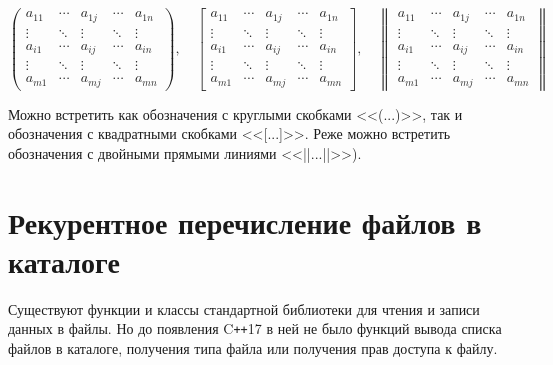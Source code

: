 \documentclass[a4paper, 12pt]{article} %
\begin{document}
\begin{equation*}
    \begin{pmatrix}
        a_{11} & \cdots & a_{1j} & \cdots & a_{1n} \\
        \vdots & \ddots & \vdots & \ddots & \vdots \\
        a_{i1} & \cdots & a_{ij} & \cdots & a_{in} \\
        \vdots & \ddots & \vdots & \ddots & \vdots \\
        a_{m1} & \cdots & a_{mj} & \cdots & a_{mn}
    \end{pmatrix},\quad\left[\begin{array}{ccccc}
            a_{11} & \cdots & a_{1j} & \cdots & a_{1n} \\
            \vdots & \ddots & \vdots & \ddots & \vdots \\
            a_{i1} & \cdots & a_{ij} & \cdots & a_{in} \\
            \vdots & \ddots & \vdots & \ddots & \vdots \\
            a_{m1} & \cdots & a_{mj} & \cdots & a_{mn}
        \end{array}\right],\quad\left\|\begin{array}{ccccc}
        a_{11} & \cdots & a_{1j} & \cdots & a_{1n} \\
        \vdots & \ddots & \vdots & \ddots & \vdots \\
        a_{i1} & \cdots & a_{ij} & \cdots & a_{in} \\
        \vdots & \ddots & \vdots & \ddots & \vdots \\
        a_{m1} & \cdots & a_{mj} & \cdots & a_{mn}
    \end{array}\right\|
\end{equation*}

Можно встретить как обозначения с круглыми скобками <<(...)>>, так и обозначения с квадратными скобками <<[...]>>. Реже можно встретить обозначения с двойными прямыми линиями <<||...||>>).

\clearpage

\section*{Рекурентное перечисление файлов в каталоге}
Существуют функции и классы стандартной библиотеки для чтения и записи данных в файлы. Но до появления C\texttt{++}17 в ней не было функций вывода списка файлов в каталоге, получения типа файла или получения прав доступа к файлу.
\end{document}
